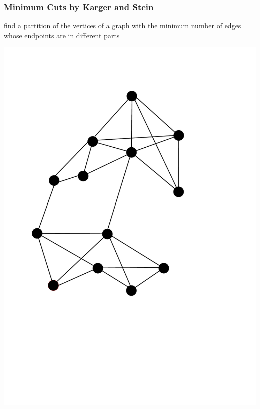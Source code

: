 \documentclass[titlepage,german,presentation]{beamer}
\begin{document}
\begin{frame}
\frametitle{Minimum Cuts by Karger and Stein}
\begin{block}{}
  find a partition of the vertices of a graph with the minimum number of edges whose endpoints are in different parts
\end{block}
\includegraphics[height=0.6\textheight]{min-cut-1.pdf}

\end{frame}
\end{document}
